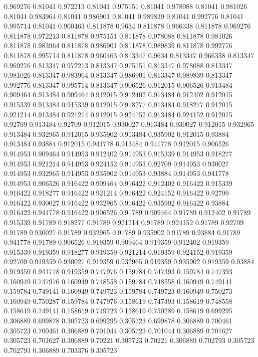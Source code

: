 0.969276 0.81041
0.972213 0.81041
0.975151 0.81041
0.978088 0.81041
0.981026 0.81041
0.983964 0.81041
0.986901 0.81041
0.989839 0.81041
0.992776 0.81041
0.995714 0.81041
0.960463 0.811878
0.9634 0.811878
0.966338 0.811878
0.969276 0.811878
0.972213 0.811878
0.975151 0.811878
0.978088 0.811878
0.981026 0.811878
0.983964 0.811878
0.986901 0.811878
0.989839 0.811878
0.992776 0.811878
0.995714 0.811878
0.960463 0.813347
0.9634 0.813347
0.966338 0.813347
0.969276 0.813347
0.972213 0.813347
0.975151 0.813347
0.978088 0.813347
0.981026 0.813347
0.983964 0.813347
0.986901 0.813347
0.989839 0.813347
0.992776 0.813347
0.995714 0.813347
0.906526 0.912015
0.906526 0.913484
0.909464 0.913484
0.909464 0.912015
0.912402 0.913484
0.912402 0.912015
0.915339 0.913484
0.915339 0.912015
0.918277 0.913484
0.918277 0.912015
0.921214 0.913484
0.921214 0.912015
0.924152 0.913484
0.924152 0.912015
0.92709 0.913484
0.92709 0.912015
0.930027 0.913484
0.930027 0.912015
0.932965 0.913484
0.932965 0.912015
0.935902 0.913484
0.935902 0.912015
0.93884 0.913484
0.93884 0.912015
0.941778 0.913484
0.941778 0.912015
0.906526 0.914953
0.909464 0.914953
0.912402 0.914953
0.915339 0.914953
0.918277 0.914953
0.921214 0.914953
0.924152 0.914953
0.92709 0.914953
0.930027 0.914953
0.932965 0.914953
0.935902 0.914953
0.93884 0.914953
0.941778 0.914953
0.906526 0.916422
0.909464 0.916422
0.912402 0.916422
0.915339 0.916422
0.918277 0.916422
0.921214 0.916422
0.924152 0.916422
0.92709 0.916422
0.930027 0.916422
0.932965 0.916422
0.935902 0.916422
0.93884 0.916422
0.941778 0.916422
0.906526 0.91789
0.909464 0.91789
0.912402 0.91789
0.915339 0.91789
0.918277 0.91789
0.921214 0.91789
0.924152 0.91789
0.92709 0.91789
0.930027 0.91789
0.932965 0.91789
0.935902 0.91789
0.93884 0.91789
0.941778 0.91789
0.906526 0.919359
0.909464 0.919359
0.912402 0.919359
0.915339 0.919359
0.918277 0.919359
0.921214 0.919359
0.924152 0.919359
0.92709 0.919359
0.930027 0.919359
0.932965 0.919359
0.935902 0.919359
0.93884 0.919359
0.941778 0.919359
0.747976 0.159784
0.747393 0.159784
0.747393 0.160949
0.747976 0.160949
0.748558 0.159784
0.748558 0.160949
0.749141 0.159784
0.749141 0.160949
0.749723 0.159784
0.749723 0.160949
0.750273 0.160949
0.750287 0.159784
0.747976 0.158619
0.747393 0.158619
0.748558 0.158619
0.749141 0.158619
0.749723 0.158619
0.750289 0.158619
0.699295 0.306889
0.699878 0.305723
0.699295 0.305723
0.699878 0.306889
0.700461 0.305723
0.700461 0.306889
0.701044 0.305723
0.701044 0.306889
0.701627 0.305723
0.701627 0.306889
0.70221 0.305723
0.70221 0.306889
0.702793 0.305723
0.702793 0.306889
0.703376 0.305723
